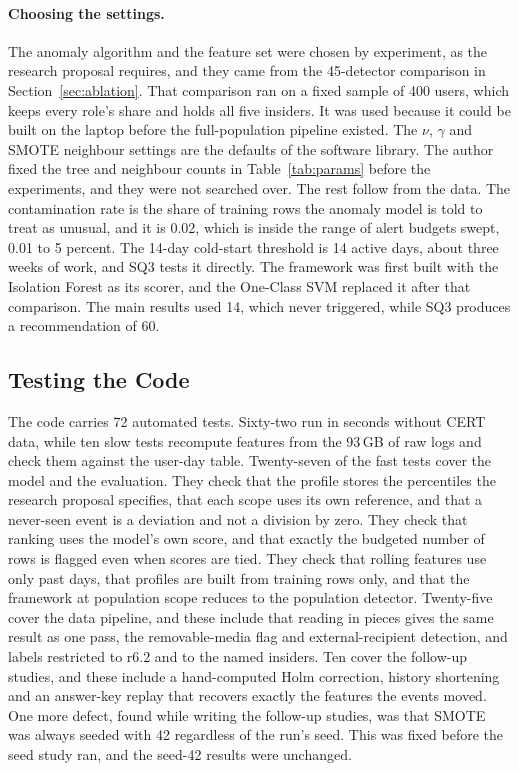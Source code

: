 \documentclass[a4paper,12pt]{article}
\begin{document}
\paragraph{Choosing the settings.} The anomaly algorithm and the feature set were chosen by experiment, as the research proposal requires, and they came from the 45-detector comparison in Section~\ref{sec:ablation}. That comparison ran on a fixed sample of 400 users, which keeps every role's share and holds all five insiders. It was used because it could be built on the laptop before the full-population pipeline existed. The $\nu$, $\gamma$ and SMOTE neighbour settings are the defaults of the software library. The author fixed the tree and neighbour counts in Table~\ref{tab:params} before the experiments, and they were not searched over. The rest follow from the data. The contamination rate is the share of training rows the anomaly model is told to treat as unusual, and it is 0.02, which is inside the range of alert budgets swept, 0.01 to 5 percent. The 14-day cold-start threshold is 14 active days, about three weeks of work, and SQ3 tests it directly. The framework was first built with the Isolation Forest as its scorer, and the One-Class SVM replaced it after that comparison. The main results used 14, which never triggered, while SQ3 produces a recommendation of 60.

\subsection{Testing the Code}
\label{sec:validation}
The code carries 72 automated tests. Sixty-two run in seconds without CERT data, while ten slow tests recompute features from the 93\,GB of raw logs and check them against the user-day table. Twenty-seven of the fast tests cover the model and the evaluation. They check that the profile stores the percentiles the research proposal specifies, that each scope uses its own reference, and that a never-seen event is a deviation and not a division by zero. They check that ranking uses the model's own score, and that exactly the budgeted number of rows is flagged even when scores are tied. They check that rolling features use only past days, that profiles are built from training rows only, and that the framework at population scope reduces to the population detector. Twenty-five cover the data pipeline, and these include that reading in pieces gives the same result as one pass, the removable-media flag and external-recipient detection, and labels restricted to r6.2 and to the named insiders. Ten cover the follow-up studies, and these include a hand-computed Holm correction, history shortening and an answer-key replay that recovers exactly the features the events moved. One more defect, found while writing the follow-up studies, was that SMOTE was always seeded with 42 regardless of the run's seed. This was fixed before the seed study ran, and the seed-42 results were unchanged.
\end{document}
